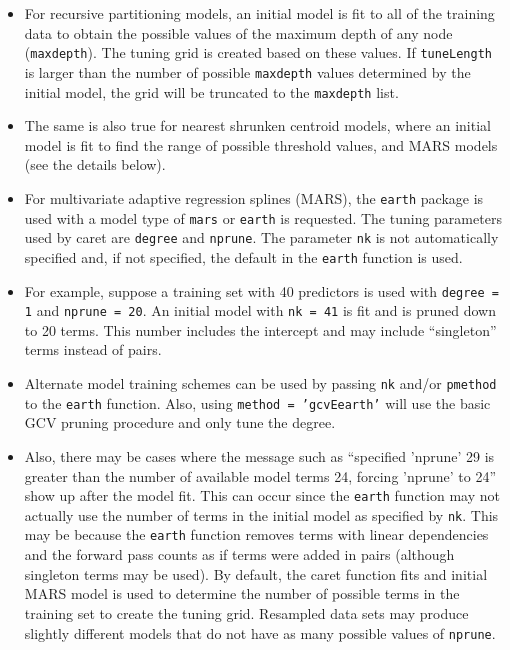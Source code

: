 \documentclass[12pt]{article}
\newcommand{\code}[1]{\mbox{\footnotesize\color{darkblue}\texttt{#1}}}
\newcommand{\pkg}[1]{{\fontseries{b}\selectfont #1}}
\renewcommand{\pkg}[1]{{\textsf{#1}}}
\begin{document}
\begin{itemize}
\item For recursive partitioning models, an initial model is
  fit to all of the training data to obtain the possible
  values of the maximum depth of any node
  (\code{maxdepth}). The tuning grid is created based on
  these values. If \code{tuneLength} is larger than the
  number of possible \code{maxdepth} values determined by
  the initial model, the grid will be truncated to the
  \code{maxdepth} list. 
  
\item [] The same is also true for nearest shrunken centroid
  models, where an initial model is fit to find the range of
  possible threshold values, and MARS models (see the details
  below). 
  
\item For multivariate adaptive regression splines (MARS), the
  \texttt{earth} package is used with a model type of \code{mars}
  or \code{earth} is requested. The tuning parameters used by
  \pkg{caret} are \code{degree} and \code{nprune}. The
  parameter \code{nk} is not automatically specified and, if not
  specified, the default in the \code{earth} function is used.  

\item [] For example, suppose a training set with 40 predictors is
  used with \code{degree = 1} and \code{nprune = 20}. An initial
  model with \code{nk = 41} is fit and is pruned down to 20
  terms. This number includes the intercept and may include
  ``singleton'' terms instead of pairs.  

\item [] Alternate model training schemes can be used by passing
  \code{nk} and/or \code{pmethod} to the \code{earth}
  function. Also, using \code{method = 'gcvEearth'} will use the
  basic GCV pruning procedure and only tune the degree.

\item [] Also, there may be cases where the message such as
  ``specified 'nprune' 29 is greater than the number of available
  model terms 24, forcing 'nprune' to 24'' show up after the model
  fit. This can occur since the \code{earth} function may not
  actually use the number of terms in the initial model as specified
  by \code{nk}. This may be because the \code{earth} function
  removes terms with linear dependencies and  the forward pass
  counts as if terms were added in pairs (although singleton terms
  may be used). By default, the \pkg{caret} function fits and
  initial MARS model is used to determine the number of possible
  terms in the training set to create the tuning grid. Resampled
  data sets may produce slightly different models that do not have
  as many possible values of  \code{nprune}. 
  

\end{itemize}
\end{document}
